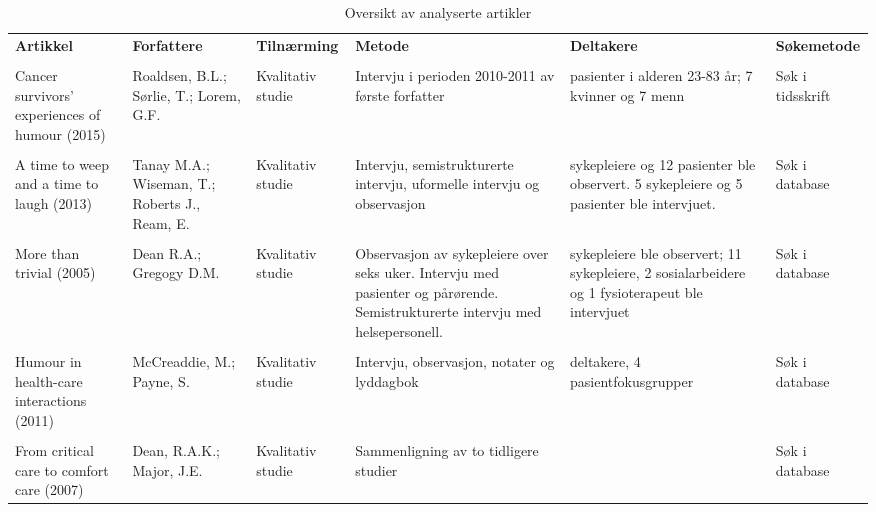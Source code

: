 \begin{landscape}
  \begin{table}
    \centering
    \small
    \begin{tabularx}{\paperwidth}{
        >{\raggedright\arraybackslash}X
        >{\raggedright\arraybackslash}X
        l
        >{\raggedright\arraybackslash}X
        >{\raggedright\arraybackslash}X
        l}
      \textbf{Artikkel} &
      \textbf{Forfattere} &
      \textbf{Tilnærming} &
      \textbf{Metode} &
      \textbf{Deltakere} &
      \textbf{Søkemetode} \\
      \\
      Cancer survivors’ experiences of humour (2015) &
      Roaldsen, B.L.; S{\o}rlie, T.; Lorem, G.F. &
      Kvalitativ studie &
      Intervju i perioden 2010-2011 av første forfatter &
      14 pasienter i alderen 23-83 år; 7 kvinner og 7 menn &
      Søk i tidsskrift
      \\ \\
      A time to weep and a time to laugh (2013) &
      Tanay M.A.; Wiseman, T.; Roberts J., Ream, E. &
      Kvalitativ studie &
      Intervju, semistrukturerte intervju, uformelle intervju og observasjon &
      9 sykepleiere og 12 pasienter ble observert. 5 sykepleiere og 5 pasienter ble intervjuet. &
      Søk i database
      \\ \\
      More than trivial (2005) &
      Dean R.A.; Gregogy D.M. &
      Kvalitativ studie &
      Observasjon av sykepleiere over seks uker. Intervju med
      pasienter og pårørende. Semistrukturerte intervju med helsepersonell. &
      6 sykepleiere ble observert; 11 sykepleiere, 2
      sosialarbeidere og 1 fysioterapeut ble intervjuet &
      Søk i database
      \\ \\
      Humour in health-care interactions (2011) &
      McCreaddie, M.; Payne, S. &
      Kvalitativ studie &
      Intervju, observasjon, notater og lyddagbok &
      32 deltakere, 4 pasientfokusgrupper &
      Søk i database
      \\ \\
      From critical care to comfort care (2007) &
      Dean, R.A.K.; Major, J.E. &
      Kvalitativ studie &
      Sammenligning av to tidligere studier &
      &
      Søk i database
    \end{tabularx}
    \label{tabell.artikler}
    \caption{Oversikt av analyserte artikler}
  \end{table}
\end{landscape}

